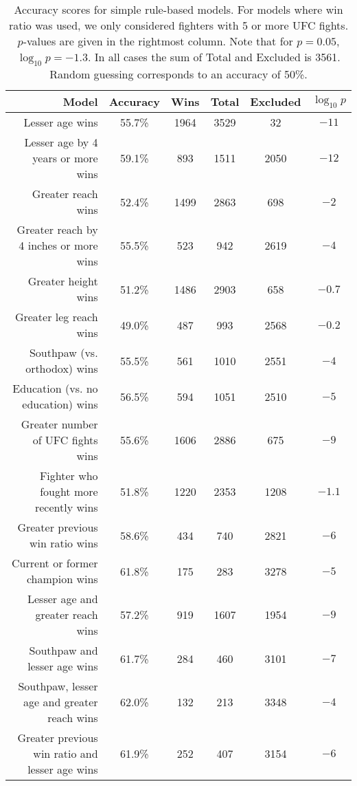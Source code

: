 \begin{center}
\begin{table}[h]
\begin{tabular}{r|ccccc}
  \toprule
  Model & Accuracy & Wins & Total & Excluded & $\log_{10}p$\\
  \hline
  Lesser age wins & 55.7\% & 1964 & 3529 & 32 & $-11$\\
  Lesser age by 4 years or more wins & 59.1\% & 893 & 1511 & 2050 & $-12$\\
  Greater reach wins & 52.4\% & 1499 & 2863 & 698 & $-2$\\
  Greater reach by 4 inches or more wins & 55.5\% & 523 & 942 & 2619 & $-4$\\
  Greater height wins & 51.2\% & 1486 & 2903 & 658 & $-0.7$\\
  Greater leg reach wins & 49.0\% & 487 & 993 & 2568 & $-0.2$\\
  Southpaw (vs. orthodox) wins & 55.5\% & 561 & 1010 & 2551 & $-4$\\
  Education (vs. no education) wins & 56.5\% & 594 & 1051 & 2510 & $-5$\\
  Greater number of UFC fights wins & 55.6\% & 1606 & 2886 & 675 & $-9$\\
  Fighter who fought more recently wins & 51.8\% & 1220 & 2353 & 1208 & $-1.1$\\
  Greater previous win ratio wins & 58.6\% & 434 & 740 & 2821 & $-6$\\
  Current or former champion wins & 61.8\% & 175 & 283 & 3278 & $-5$\\
  \hline
  Lesser age and greater reach wins & 57.2\% & 919 & 1607 & 1954 & $-9$\\
  Southpaw and lesser age wins & 61.7\% & 284 & 460 & 3101 & $-7$\\
  Southpaw, lesser age and greater reach wins & 62.0\% & 132 & 213 & 3348 & $-4$\\
  Greater previous win ratio and lesser age wins & 61.9\% & 252 & 407 & 3154 & $-6$\\
  \bottomrule
\end{tabular}
\caption{Accuracy scores for simple rule-based models. For models where win ratio was used, we only considered
fighters with 5 or more UFC fights. $p$-values are given in the rightmost column. Note that for $p=0.05$, $\log_{10}p = -1.3$. In all
cases the sum of 
Total and Excluded is 3561. Random guessing corresponds to an accuracy of 50\%.}
\label{table_simple_rules}
\end{table}
\end{center}

